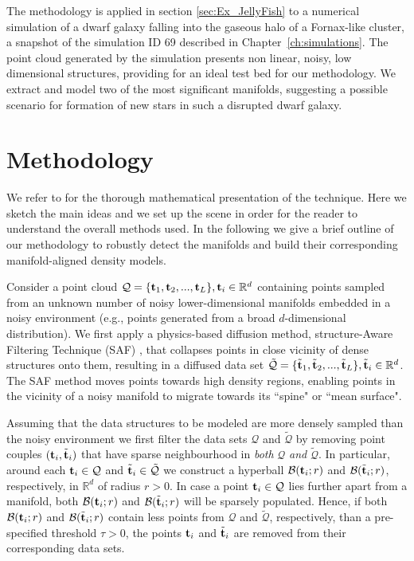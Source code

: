The methodology is applied in section \ref{sec:Ex_JellyFish} to a numerical simulation of a dwarf galaxy falling into the gaseous halo of a Fornax-like cluster, a snapshot of the simulation ID 69 described in Chapter~\ref{ch:simulations}.
{The point cloud generated by the simulation presents non linear, noisy, low dimensional structures,
providing for an ideal test bed for our methodology.}
We extract and model two of the most significant manifolds, suggesting a possible scenario for formation of new stars in such a disrupted dwarf galaxy.

\section{Methodology} \label{sec:Methodology}
We refer to \citet{Canducci2021} for the thorough mathematical presentation of the technique.
Here we sketch the main ideas and we set up the scene in order for the reader to understand the overall methods used.
In the following we give a brief outline of our methodology to robustly detect the manifolds and build their corresponding manifold-aligned density models.

Consider a point cloud $\mathcal{Q} =\{\boldsymbol{\mathbf{t}}_1, \boldsymbol{\mathbf{t}}_2,...,\boldsymbol{\mathbf{t}}_L\}, \boldsymbol{\mathbf{t}}_i \in \mathbb{R}^d$ containing points sampled from an unknown number of noisy lower-dimensional manifolds embedded in a noisy environment (e.g., points generated from a broad $d$-dimensional distribution).
We first apply a physics-based diffusion method, structure-Aware Filtering Technique (SAF) \cite{8046026}, that collapses points in close vicinity of dense structures onto them, resulting in a diffused data set 
$\tilde{\mathcal{Q}} =\{\tilde{\boldsymbol{\mathbf{t}}}_1, \tilde{\boldsymbol{\mathbf{t}}}_2,...,\tilde{\boldsymbol{\mathbf{t}}}_L\},  \tilde{\boldsymbol{\mathbf{t}}}_i \in \mathbb{R}^d$.
The SAF method moves points towards high density regions, enabling points in the vicinity of a noisy manifold to migrate towards its ``spine" or ``mean surface".

Assuming that the data structures to be modeled are more densely sampled than the noisy environment
 we first filter the data sets $\mathcal{Q}$ and $\tilde{\mathcal{Q}}$ by removing point couples  $(\boldsymbol{\mathbf{t}}_i,\tilde{\boldsymbol{\mathbf{t}}}_i)$ that have sparse neighbourhood in {\em both} $\mathcal{Q}$ {\em and} $\tilde{\mathcal{Q}}$.
In particular, around each $\boldsymbol{\mathbf{t}}_i \in \mathcal{Q}$ and $\tilde{\boldsymbol{\mathbf{t}}}_i \in \tilde{\mathcal{Q}}$ we construct a hyperball $\mathcal{B}(\boldsymbol{\mathbf{t}}_i;r)$ and $\mathcal{B}(\tilde{\boldsymbol{\mathbf{t}}}_i;r)$,
respectively, in $\mathbb{R}^d$ of radius $r>0$.
In case a point $\boldsymbol{\mathbf{t}}_i \in \mathcal{Q}$ lies further apart from a manifold, both $\mathcal{B}(\boldsymbol{\mathbf{t}}_i;r)$ and $\mathcal{B}(\tilde{\boldsymbol{\mathbf{t}}}_i;r)$ will be sparsely populated.  Hence, if both $\mathcal{B}(\boldsymbol{\mathbf{t}}_i;r)$ and $\mathcal{B}(\tilde{\boldsymbol{\mathbf{t}}}_i;r)$ contain less points from  $\mathcal{Q}$ and $\tilde{\mathcal{Q}}$, respectively, than a pre-specified threshold $\tau>0$, the points $\boldsymbol{\mathbf{t}}_i$ and $\tilde{\boldsymbol{\mathbf{t}}}_i$ are removed from their corresponding data sets.


